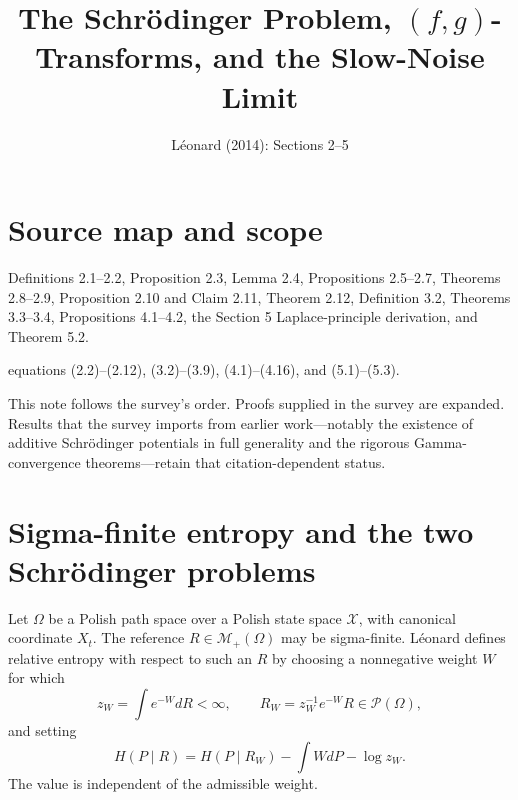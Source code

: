 
\title{The Schr\"odinger Problem, $(f,g)$-Transforms, and the Slow-Noise Limit}
\author{}
\date{L\'eonard (2014): Sections 2--5}

\maketitle

\section*{Source map and scope}
\begin{description}[style=nextline,leftmargin=3.2cm,labelwidth=3cm]
\item[Primary source] \texttt{}
\item[Coverage] Definitions 2.1--2.2, Proposition 2.3, Lemma 2.4, Propositions 2.5--2.7, Theorems 2.8--2.9, Proposition 2.10 and Claim 2.11, Theorem 2.12, Definition 3.2, Theorems 3.3--3.4, Propositions 4.1--4.2, the Section 5 Laplace-principle derivation, and Theorem 5.2.
\item[Source anchors] equations (2.2)--(2.12), (3.2)--(3.9), (4.1)--(4.16), and (5.1)--(5.3).
\end{description}

This note follows the survey's order.  Proofs supplied in the survey are expanded.  Results that the
survey imports from earlier work---notably the existence of additive Schr\"odinger potentials in full
generality and the rigorous Gamma-convergence theorems---retain that citation-dependent status.

\section{Sigma-finite entropy and the two Schr\"odinger problems}
Let \(\Omega\) be a Polish path space over a Polish state space \(\mathcal X\), with canonical
coordinate \(X_t\).  The reference \(R\in\mathcal M_+(\Omega)\) may be sigma-finite.  L\'eonard
defines relative entropy with respect to such an \(R\) by choosing a nonnegative weight \(W\) for
which
\[
 z_W=\int e^{-W}dR<\infty,
 \qquad
 R_W=z_W^{-1}e^{-W}R\in\mathcal P(\Omega),
\]
and setting
\begin{equation}\label{eq:leo-sigmafinite-entropy}
 H(P\mid R)=H(P\mid R_W)-\int WdP-\log z_W.
\end{equation}
The value is independent of the admissible weight.

